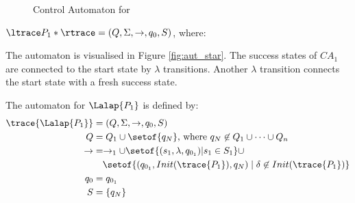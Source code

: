 \begin{figure}
\centering
{}
\caption{Control Automaton for }
\label{fig:aut_seq}
\end{figure}
\fi
\iffull

\begin{definition}
$\ltrace P_1* \rtrace = ( Q, \Sigma, \rightarrow, q_0, S)$, where:
\begin{itemize}
\item $Q = Q_{1} \cup \{q_N\}$, where $q_N$ is a fresh state;
\item $\rightarrow = \rightarrow_{1} \cup \{(s_1, \lambda, q_{0_1)|s_1 \in S_1\} \cup \{(q_{0_1},\lambda,q_N)\}$;
\item $q_{0} = q_{0_1}$;
\item $S = q_N$.
\end{itemize}
\end{definition}


The automaton is visualised in Figure \ref{fig:aut_star}. The success states of $CA_1$ are connected to the start state by $\lambda$ transitions. Another $\lambda$ transition connects the start state with a fresh success state.

\fi
\iffull
The automaton for $\Lalap{P_1}$ is defined by:
\begin{align*}
\trace{\Lalap{P_1}} &= ( Q, \Sigma, \rightarrow, q_{0}, S)\\
Q &= Q_{1} \cup \setof{q_N} \text{, where $q_N \not\in Q_1 \cup \dots \cup Q_n$}\\
{\rightarrow} &= \rightarrow_{1} \cup \setof{(s_1,\lambda,q_{0_1})|s_1 \in S_1 } \cup\\
	& \quad \setof{(q_{0_1},Init(\trace{P_1}),q_N) \mid \delta \not\in Init(\trace{P_1}) }\\
q_{0} &= q_{0_1}\\
S &= \{q_N\}\\
\end{align*}


